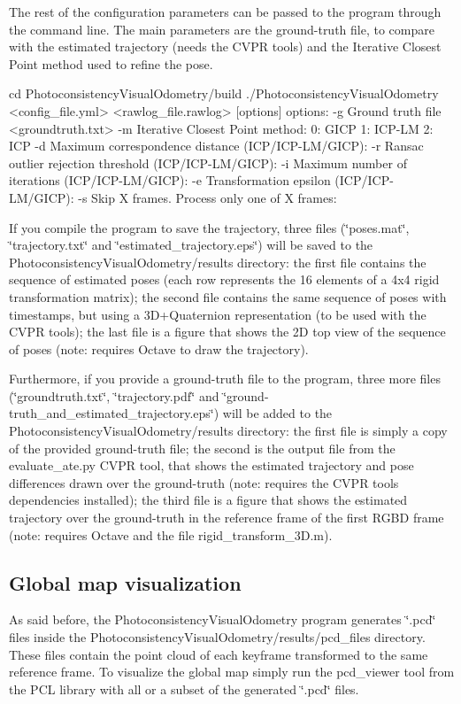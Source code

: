 The rest of the configuration parameters can be passed to the program through the command line. The main parameters are the ground-\/truth file, to compare with the estimated trajectory (needs the CVPR tools) and the Iterative Closest Point method used to refine the pose.

\begin{DoxyVerb}
cd PhotoconsistencyVisualOdometry/build
./PhotoconsistencyVisualOdometry <config_file.yml> <rawlog_file.rawlog> [options]
       options: 
               -g          Ground truth file <groundtruth.txt>
               -m          Iterative Closest Point method:
                           0: GICP
                           1: ICP-LM
                           2: ICP
               -d          Maximum correspondence distance (ICP/ICP-LM/GICP):
               -r          Ransac outlier rejection threshold (ICP/ICP-LM/GICP):
               -i          Maximum number of iterations (ICP/ICP-LM/GICP):
               -e          Transformation epsilon (ICP/ICP-LM/GICP):
               -s          Skip X frames. Process only one of X frames:
\end{DoxyVerb}


If you compile the program to save the trajectory, three files (\char`\"{}poses.mat\char`\"{}, \char`\"{}trajectory.txt\char`\"{} and \char`\"{}estimated\_\-trajectory.eps\char`\"{}) will be saved to the PhotoconsistencyVisualOdometry/results directory: the first file contains the sequence of estimated poses (each row represents the 16 elements of a 4x4 rigid transformation matrix); the second file contains the same sequence of poses with timestamps, but using a 3D+Quaternion representation (to be used with the CVPR tools); the last file is a figure that shows the 2D top view of the sequence of poses (note: requires Octave to draw the trajectory).

Furthermore, if you provide a ground-\/truth file to the program, three more files (\char`\"{}groundtruth.txt\char`\"{}, \char`\"{}trajectory.pdf\char`\"{} and \char`\"{}ground-\/truth\_\-and\_\-estimated\_\-trajectory.eps\char`\"{}) will be added to the PhotoconsistencyVisualOdometry/results directory: the first file is simply a copy of the provided ground-\/truth file; the second is the output file from the evaluate\_\-ate.py CVPR tool, that shows the estimated trajectory and pose differences drawn over the ground-\/truth (note: requires the CVPR tools dependencies installed); the third file is a figure that shows the estimated trajectory over the ground-\/truth in the reference frame of the first RGBD frame (note: requires Octave and the file rigid\_\-transform\_\-3D.m).\hypertarget{index_A}{}\subsection{Global map visualization}\label{index_A}
As said before, the PhotoconsistencyVisualOdometry program generates \char`\"{}.pcd\char`\"{} files inside the PhotoconsistencyVisualOdometry/results/pcd\_\-files directory. These files contain the point cloud of each keyframe transformed to the same reference frame. To visualize the global map simply run the pcd\_\-viewer tool from the PCL library with all or a subset of the generated \char`\"{}.pcd\char`\"{} files.


